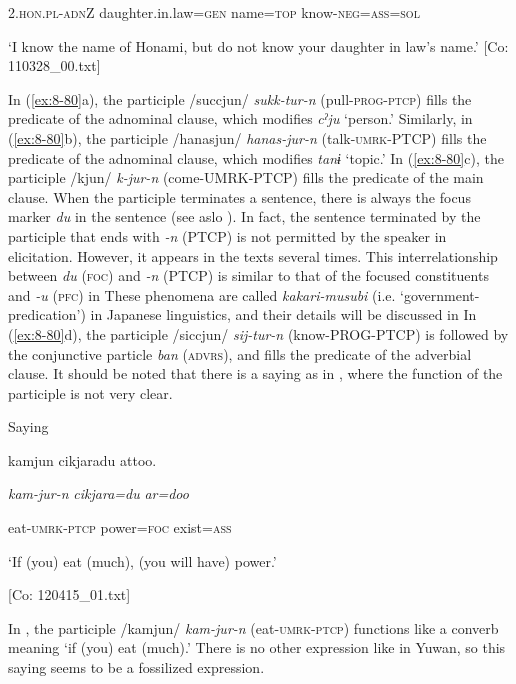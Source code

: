       2.\textsc{hon}.\textsc{pl}-\textsc{adn}Z  daughter.in.law=\textsc{gen}  name=\textsc{top}  know-\textsc{neg}=\textsc{ass}=\textsc{sol}

\glt ‘I know the name of Honami, but do not know your daughter in law’s name.’ [Co: 110328\_00.txt]
\z

In (\ref{ex:8-80}a), the participle /succjun/ \textit{sukk-tur-n} (pull-\textsc{prog}-\textsc{ptcp}) fills the predicate of the adnominal clause, which modifies \textit{cˀju} ‘person.’ Similarly, in (\ref{ex:8-80}b), the participle /hanasjun/ \textit{hanas-jur-n} (talk-\textsc{umrk}-PTCP) fills the predicate of the adnominal clause, which modifies \textit{tanɨ} ‘topic.’ In (\ref{ex:8-80}c), the participle /kjun/ \textit{k-jur-n} (come-UMRK-PTCP) fills the predicate of the main clause. When the participle terminates a sentence, there is always the focus marker \textit{du} in the sentence (see aslo ). In fact, the sentence terminated by the participle that ends with \textit{{}-n} (PTCP) is not permitted by the speaker in elicitation. However, it appears in the texts several times. This interrelationship between \textit{du} (\textsc{foc}) and \textit{{}-n} (PTCP) is similar to that of the focused constituents and \textit{-u} (\textsc{pfc}) in  These phenomena are called \textit{kakari-musubi} (i.e. ‘government-predication’) in Japanese linguistics, and their details will be discussed in  In (\ref{ex:8-80}d), the participle /siccjun/ \textit{sij-tur-n} (know-PROG-PTCP) is followed by the conjunctive particle \textit{ban} (\textsc{advrs}), and fills the predicate of the adverbial clause. It should be noted that there is a saying as in , where the function of the participle is not very clear.

\ea\label{ex:8-81}
  Saying

  {\TM}
\glll  kamjun  cikjaradu  attoo.

    \textit{kam-jur-n}  \textit{cikjara=du}  \textit{ar=doo}

    eat-\textsc{umrk}-\textsc{ptcp}  power=\textsc{foc}  exist=\textsc{ass}

    ‘If (you) eat (much), (you will have) power.’

    [Co: 120415\_01.txt]
\z

In , the participle /kamjun/ \textit{kam-jur-n} (eat-\textsc{umrk}-\textsc{ptcp}) functions like a converb meaning ‘if (you) eat (much).’ There is no other expression like  in Yuwan, so this saying seems to be a fossilized expression.


